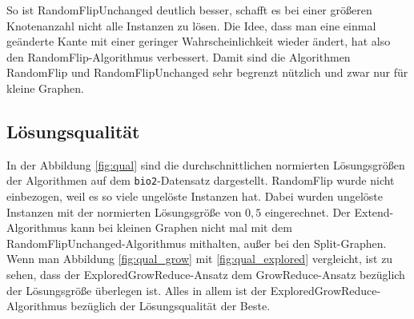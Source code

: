 \documentclass[12pt,a4paper,onecolumn,oneside,titlepage]{article}
\newcommand{\vars}{\texttt}
\begin{document}
So ist RandomFlipUnchanged deutlich besser, schafft es bei einer größeren Knotenanzahl nicht alle Instanzen zu lösen.
Die Idee, dass man eine einmal geänderte Kante mit einer geringer Wahrscheinlichkeit wieder ändert, hat also den RandomFlip-Algorithmus verbessert. Damit sind die Algorithmen RandomFlip und RandomFlipUnchanged sehr begrenzt nützlich und zwar nur für kleine Graphen. 

\subsection{Lösungsqualität}
In der Abbildung \ref{fig:qual} sind die durchschnittlichen normierten Lösungsgrößen der Algorithmen auf dem \vars{bio2}-Datensatz dargestellt. RandomFlip wurde nicht einbezogen, weil es so viele ungelöste Instanzen hat. Dabei wurden ungelöste Instanzen mit der normierten Lösungsgröße von $0,5$ eingerechnet.
Der Extend-Algorithmus kann bei kleinen Graphen nicht mal mit dem RandomFlipUnchanged-Algorithmus mithalten, außer bei den Split-Graphen. 
Wenn man Abbildung \ref{fig:qual_grow} mit \ref{fig:qual_explored} vergleicht, ist zu sehen, dass der ExploredGrowReduce-Ansatz dem GrowReduce-Ansatz bezüglich der Lösungsgröße überlegen ist. Alles in allem ist der ExploredGrowReduce-Algorithmus bezüglich der Lösungsqualität der Beste.
\end{document}
